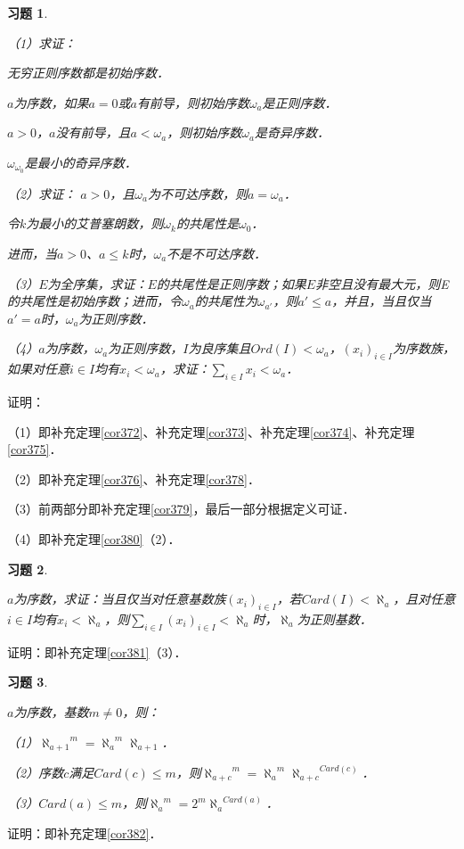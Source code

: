 \documentclass[12pt, a4paper, oneside]{book}
\newtheorem{exer}{习题}
\begin{document}
			\begin{exer}\label{exer171}
				\hfill\par
				（1）求证：
				\par
				无穷正则序数都是初始序数．
				\par
				$a$为序数，如果$a=0$或$a$有前导，则初始序数$\omega_a$是正则序数．
				\par
				$a>0$，$a$没有前导，且$a<\omega_a$，则初始序数$\omega_a$是奇异序数．
				\par		
				$\omega_{\omega_0}$是最小的奇异序数．
				\par
				（2）求证：
				$a>0$，且$\omega_a$为不可达序数，则$a=\omega_a$．
				\par
				令$k$为最小的艾普塞朗数，则$\omega_k$的共尾性是$\omega_0$．
				\par
				进而，当$a>0$、$a\leq k$时，$\omega_a$不是不可达序数．
				\par
				（3）$E$为全序集，求证：$E$的共尾性是正则序数；如果$E$非空且没有最大元，则E的共尾性是初始序数；进而，令$\omega_a$的共尾性为$\omega_{a'}$，则$a'\leq a$，并且，当且仅当$a'=a$时，$\omega_a$为正则序数．
				\par
				（4）$a$为序数，$\omega_a$为正则序数，$I$为良序集且$Ord(I)<\omega_a$，$(x_i)_{i\in I}$为序数族，如果对任意$i\in I$均有$x_i<\omega_a$，求证：$\sum\limits_{i\in I}x_i<\omega_a$．
			\end{exer}
			证明：
			\par
			（1）即补充定理\ref{cor372}、补充定理\ref{cor373}、补充定理\ref{cor374}、补充定理\ref{cor375}．
			\par
			（2）即补充定理\ref{cor376}、补充定理\ref{cor378}．
			\par
			（3）前两部分即补充定理\ref{cor379}，最后一部分根据定义可证．
			\par
			（4）即补充定理\ref{cor380}（2）．
			
			\begin{exer}\label{exer172}
				\hfill\par
				$a$为序数，求证：当且仅当对任意基数族$(x_i)_{i\in I}$，若$Card(I)<\aleph_a$，且对任意$i\in I$均有$x_i<\aleph_a$，则$\sum\limits_{i\in I}(x_i)_{i\in I}<\aleph_a$时，$\aleph_a$为正则基数．
			\end{exer}
			证明：即补充定理\ref{cor381}（3）．
			
			\begin{exer}\label{exer173}
				\hfill\par
				$a$为序数，基数$m\neq 0$，则：
				\par
				（1）${\aleph_{a+1}}^m={\aleph_a}^m\aleph_{a+1}$．
				\par
				（2）序数$c$满足$Card(c)\leq m$，则${\aleph_{a+c}}^m={\aleph_a}^m{\aleph_{a+c}}^{Card(c)}$．
				\par
				（3）$Card(a)\leq m$，则${\aleph_a}^m=2^m{\aleph_a}^{Card(a)}$．
			\end{exer}
			证明：即补充定理\ref{cor382}．
			
\end{document}
